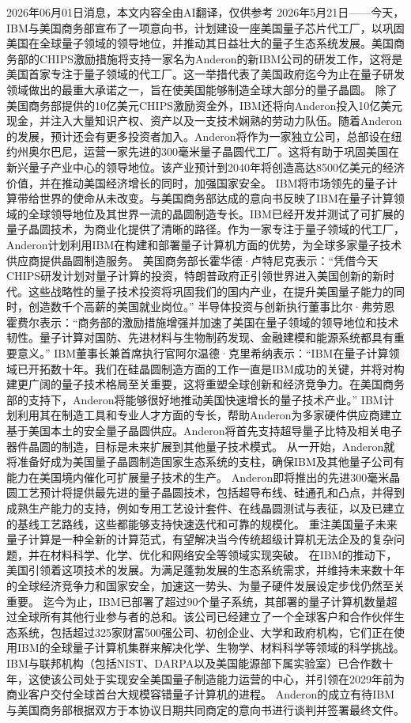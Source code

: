 \documentclass[12pt,a4paper]{ctexart}
\begin{document}
2026年06月01日消息，本文内容全由AI翻译，仅供参考
2026年5月21日——今天，IBM与美国商务部宣布了一项意向书，计划建设一座美国量子芯片代工厂，以巩固美国在全球量子领域的领导地位，并推动其日益壮大的量子生态系统发展。美国商务部的CHIPS激励措施将支持一家名为Anderon的新IBM公司的研发工作，这将是美国首家专注于量子领域的代工厂。这一举措代表了美国政府迄今为止在量子研发领域做出的最重大承诺之一，旨在使美国能够制造全球大部分的量子晶圆。
除了美国商务部提供的10亿美元CHIPS激励资金外，IBM还将向Anderon投入10亿美元现金，并注入大量知识产权、资产以及一支技术娴熟的劳动力队伍。随着Anderon的发展，预计还会有更多投资者加入。Anderon将作为一家独立公司，总部设在纽约州奥尔巴尼，运营一家先进的300毫米量子晶圆代工厂。这将有助于巩固美国在新兴量子产业中心的领导地位。该产业预计到2040年将创造高达8500亿美元的经济价值，并在推动美国经济增长的同时，加强国家安全。
IBM将市场领先的量子计算带给世界的使命从未改变。与美国商务部达成的意向书反映了IBM在量子计算领域的全球领导地位及其世界一流的晶圆制造专长。IBM已经开发并测试了可扩展的量子晶圆技术，为商业化提供了清晰的路径。作为一家专注于量子领域的代工厂，Anderon计划利用IBM在构建和部署量子计算机方面的优势，为全球多家量子技术供应商提供晶圆制造服务。
美国商务部长霍华德·卢特尼克表示：“凭借今天CHIPS研发计划对量子计算的投资，特朗普政府正引领世界进入美国创新的新时代。这些战略性的量子技术投资将巩固我们的国内产业，在提升美国量子能力的同时，创造数千个高薪的美国就业岗位。”
半导体投资与创新执行董事比尔·弗劳恩霍费尔表示：“商务部的激励措施增强并加速了美国在量子领域的领导地位和技术韧性。量子计算对国防、先进材料与生物制药发现、金融建模和能源系统都具有重要意义。”
IBM董事长兼首席执行官阿尔温德·克里希纳表示：“IBM在量子计算领域已开拓数十年。我们在硅晶圆制造方面的工作一直是IBM成功的关键，并将对构建更广阔的量子技术格局至关重要，这将重塑全球创新和经济竞争力。在美国商务部的支持下，Anderon将能够很好地推动美国快速增长的量子技术产业。”
IBM计划利用其在制造工具和专业人才方面的专长，帮助Anderon为多家硬件供应商建立基于美国本土的安全量子晶圆供应。Anderon将首先支持超导量子比特及相关电子器件晶圆的制造，目标是未来扩展到其他量子技术模式。
从一开始，Anderon就将准备好成为美国量子晶圆制造国家生态系统的支柱，确保IBM及其他量子公司有能力在美国境内催化可扩展量子技术的生产。
Anderon即将推出的先进300毫米晶圆工艺预计将提供最先进的量子晶圆技术，包括超导布线、硅通孔和凸点，并得到成熟生产能力的支持，例如专用工艺设计套件、在线晶圆测试与表征，以及已建立的基线工艺路线，这些都能够支持快速迭代和可靠的规模化。
重注美国量子未来
量子计算是一种全新的计算范式，有望解决当今传统超级计算机无法企及的复杂问题，并在材料科学、化学、优化和网络安全等领域实现突破。
在IBM的推动下，美国引领着这项技术的发展。为满足蓬勃发展的生态系统需求，并维持未来数十年的全球经济竞争力和国家安全，加速这一势头、为量子硬件发展设定步伐仍然至关重要。
迄今为止，IBM已部署了超过90个量子系统，其部署的量子计算机数量超过全球所有其他行业参与者的总和。该公司已经建立了一个全球客户和合作伙伴生态系统，包括超过325家财富500强公司、初创企业、大学和政府机构，它们正在使用IBM的全球量子计算机集群来解决化学、生物学、材料科学等领域的科学挑战。
IBM与联邦机构（包括NIST、DARPA以及美国能源部下属实验室）已合作数十年，这使该公司处于实现安全美国量子制造能力运营的中心，并引领在2029年前为商业客户交付全球首台大规模容错量子计算机的进程。
Anderon的成立有待IBM与美国商务部根据双方于本协议日期共同商定的意向书进行谈判并签署最终文件。
\end{document}

